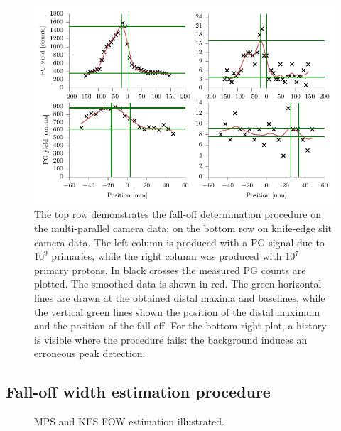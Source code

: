 \documentclass[a4paper,english]{article}
\begin{document}
\begin{figure}[htp]
  \centering
  \includegraphics[width=0.9\linewidth]{fopproc}
  \caption{The top row demonstrates the fall-off determination procedure on the multi-parallel camera data; on the bottom row on knife-edge slit camera data. The left column is produced with a PG signal due to $10^9$ primaries, while the right column was produced with $10^7$ primary protons. In black crosses the measured PG counts are plotted. The smoothed data is shown in red. The green horizontal lines are drawn at the obtained distal maxima and baselines, while the vertical green lines shown the position of the distal maximum and the position of the fall-off. For the bottom-right plot, a history is visible where the procedure fails: the background induces an erroneous peak detection.}
  \label{fig:our-fit}
\end{figure}

\subsection{Fall-off width estimation procedure}

\begin{figure}[htp]
  \centering
  \quad
  \caption{\label{FOWILLUS} MPS and KES FOW estimation illustrated.}
\end{figure}
\end{document}
